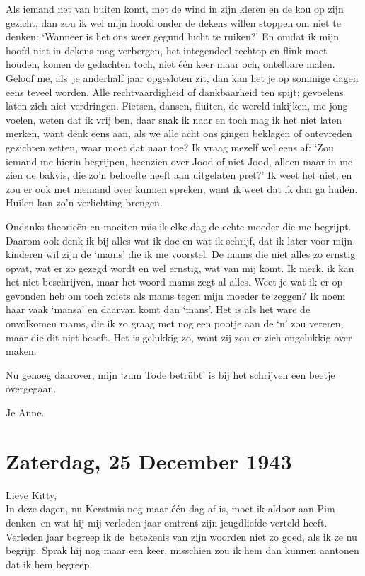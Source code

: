 \documentclass{book}
\begin{document}
Als iemand net van buiten komt, met de wind in zijn kleren en de kou op zijn
gezicht, dan zou ik wel mijn hoofd onder de dekens willen stoppen om niet te
denken: `Wanneer is het ons weer gegund lucht te ruiken?' En omdat ik mijn hoofd
niet in dekens mag verbergen, het integendeel rechtop en flink moet houden,
komen de gedachten toch, niet één keer maar och, ontelbare malen. Geloof me,
als~je anderhalf jaar opgesloten zit, dan kan het je op sommige dagen eens
teveel worden. Alle rechtvaardigheid of dankbaarheid ten spijt; gevoelens laten
zich niet verdringen. Fietsen, dansen, fluiten, de wereld inkijken, me jong
voelen, weten dat ik vrij ben, daar snak ik naar en toch mag ik het niet laten
merken, want denk eens aan, als we alle acht ons gingen beklagen of ontevreden
gezichten zetten, waar moet dat naar toe? Ik vraag mezelf wel eens af: `Zou
iemand me hierin begrijpen, heenzien over Jood of niet-Jood, alleen maar in me
zien de bakvis, die zo'n behoefte heeft aan uitgelaten pret?' Ik weet het niet,
en zou er ook met niemand over kunnen spreken, want ik weet dat ik dan ga
huilen. Huilen kan zo'n verlichting brengen.

Ondanks theorieën en moeiten mis ik elke dag de echte moeder die me begrijpt.
Daarom ook denk ik bij alles wat ik doe en wat ik schrijf, dat ik later voor
mijn kinderen wil zijn de `mams' die ik me voorstel. De mams die niet alles zo
ernstig opvat, wat er zo gezegd wordt en wel ernstig, wat van mij komt. Ik merk,
ik kan het niet beschrijven, maar het woord mams zegt al alles. Weet je wat ik
er op gevonden heb om toch zoiets als mams tegen mijn moeder te zeggen? Ik noem
haar vaak `mansa' en daarvan komt dan `mans'. Het is als het ware de onvolkomen
mams, die ik zo graag met nog een pootje aan de `n' zou vereren, maar die dit
niet beseft. Het is gelukkig zo, want zij zou er zich ongelukkig over maken.

Nu genoeg daarover, mijn `zum Tode betrübt' is bij het schrijven een beetje
overgegaan.

Je Anne.

\section*{Zaterdag, 25 December 1943}

Lieve Kitty,\\
In deze dagen, nu Kerstmis nog maar één dag af is, moet ik aldoor
aan Pim denken~en wat hij mij verleden jaar omtrent zijn jeugdliefde verteld
heeft. Verleden jaar begreep ik de~betekenis van zijn woorden niet zo goed, als
ik ze nu begrijp. Sprak hij nog maar een keer, misschien zou ik hem dan kunnen
aantonen dat ik hem begreep.
\end{document}
